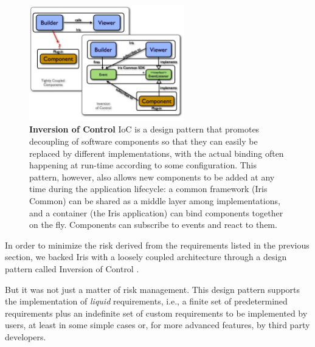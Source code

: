\documentclass[final,5p,authoryear]{elsarticle}
\begin{document}
\begin{figure} \begin{center}
\includegraphics[width=0.6\textwidth]{figures/IrisDiagrams.003.png}
\caption{\textbf{Inversion of Control} IoC is a design pattern that promotes
decoupling of software components so that they can easily be replaced by
different implementations, with the actual binding often happening at run-time
according to some configuration. This pattern, however, also allows new
components to be added at any time during the application lifecycle: a common
framework (Iris Common) can be shared as a middle layer among implementations,
and a container (the Iris application) can bind components together on the fly.
Components can subscribe to events and react to them.} \label{fig:ioc}
\end{center} \end{figure}


In order to minimize the risk derived from the requirements listed in the previous 
section, we backed Iris with a loosely coupled architecture through a design 
pattern called Inversion of Control \citep*{ioc}. 

But it was not just a matter of risk management. This design pattern  
supports the implementation of \emph{liquid} requirements, i.e., a finite set of
predetermined requirements plus an indefinite set of custom requirements to be
implemented by users, at least in some simple cases or, for more advanced
features, by third party developers.
\end{document}
